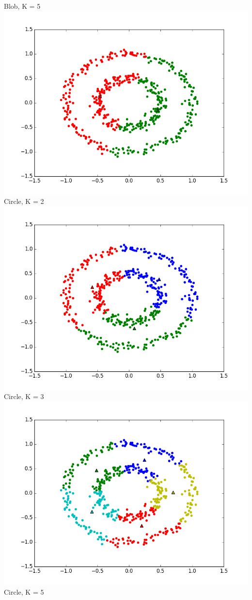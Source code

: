 \documentclass[]{report}
\begin{document}
\begin{center}
		Blob, K = 5
		\includegraphics[width=\textwidth]{circle-2}
		Circle, K = 2
		\includegraphics[width=\textwidth]{circle-3}
		Circle, K = 3
		\includegraphics[width=\textwidth]{circle-5}
		Circle, K = 5
	\end{center}
\end{document}
